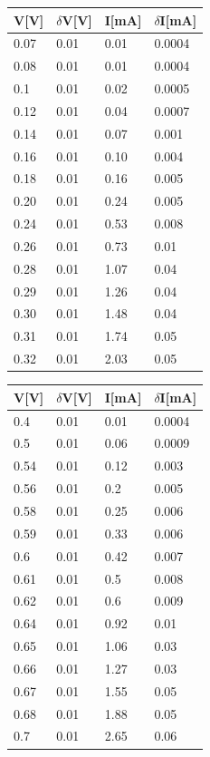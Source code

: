 \documentclass{article}
\begin{document}
    \begin{tabular}{|p{1cm}|p{1cm}|p{1cm}|p{1cm}|}
        \hline
        \textbf V[V] & $\delta$V[V] & I[mA] & $\delta$I[mA] \\
        \hline
        0.07 & 0.01 & 0.01 & 0.0004\\
        0.08 & 0.01 & 0.01 & 0.0004\\
        0.1  & 0.01 & 0.02 & 0.0005\\
        0.12 & 0.01 & 0.04 & 0.0007\\
        0.14 & 0.01 & 0.07 & 0.001\\
        0.16 & 0.01 & 0.10 & 0.004\\
        0.18 & 0.01 & 0.16 & 0.005\\
        0.20 & 0.01 & 0.24 & 0.005\\
        0.24 & 0.01 & 0.53 & 0.008\\
        0.26 & 0.01 & 0.73 & 0.01\\
        0.28 & 0.01 & 1.07 & 0.04\\
        0.29 & 0.01 & 1.26 & 0.04\\
        0.30 & 0.01 & 1.48 & 0.04\\
        0.31 & 0.01 & 1.74 & 0.05\\
        0.32 & 0.01 & 2.03 & 0.05\\
        \hline      
    \end{tabular}
    \hspace{2cm}
    \begin{tabular}{|p{1cm}|p{1cm}|p{1cm}|p{1cm}|}
        \hline
        \textbf V[V] & $\delta$V[V] & I[mA] & $\delta$I[mA] \\
        \hline
        0.4 & 0.01 & 0.01 & 0.0004\\
        0.5 & 0.01 & 0.06 & 0.0009\\
        0.54 & 0.01 & 0.12 & 0.003\\
        0.56 & 0.01 & 0.2 & 0.005\\
        0.58 & 0.01 & 0.25 & 0.006\\
        0.59 & 0.01 & 0.33 & 0.006\\
        0.6 & 0.01 & 0.42 & 0.007\\
        0.61 & 0.01 & 0.5 & 0.008\\
        0.62 & 0.01 & 0.6 & 0.009\\
        0.64 & 0.01 & 0.92 & 0.01\\
        0.65 & 0.01 & 1.06 & 0.03\\
        0.66 & 0.01 & 1.27 & 0.03\\
        0.67 & 0.01 & 1.55 & 0.05\\
        0.68 & 0.01 & 1.88 & 0.05\\
        0.7 & 0.01 & 2.65 & 0.06\\
        \hline
    \end{tabular}\\
\end{document}
